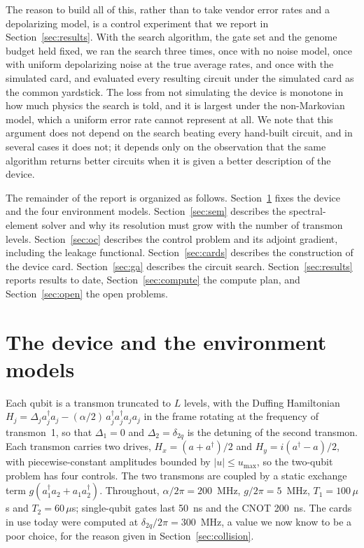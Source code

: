 \documentclass[10pt]{article}
\begin{document}
The reason to build all of this, rather than to take vendor error rates and a
depolarizing model, is a control experiment that we report in
Section~\ref{sec:results}. With the search algorithm, the gate set and the
genome budget held fixed, we ran the search three times, once with no noise
model, once with uniform depolarizing noise at the true average rates, and once
with the simulated card, and evaluated every resulting circuit under the
simulated card as the common yardstick. The loss from not simulating the
device is monotone in how much physics the search is told, and it is largest
under the non-Markovian model, which a uniform error rate cannot represent at
all. We note that this argument does not depend on the search beating every
hand-built circuit, and in several cases it does not; it depends only on the
observation that the same algorithm returns better circuits when it is given a
better description of the device.

The remainder of the report is organized as follows.
Section~\ref{sec:models} fixes the device and the four environment models.
Section~\ref{sec:sem} describes the spectral-element solver and why its
resolution must grow with the number of transmon levels.
Section~\ref{sec:oc} describes the control problem and its adjoint gradient,
including the leakage functional. Section~\ref{sec:cards} describes the
construction of the device card. Section~\ref{sec:ga} describes the circuit
search. Section~\ref{sec:results} reports results to date,
Section~\ref{sec:compute} the compute plan, and Section~\ref{sec:open} the
open problems.

\section{The device and the environment models}
\label{sec:models}

Each qubit is a transmon truncated to $L$ levels, with the Duffing Hamiltonian
$H_j = \Delta_j a_j^\dagger a_j - (\alpha/2)\, a_j^\dagger a_j^\dagger a_j a_j$
in the frame rotating at the frequency of transmon~1, so that $\Delta_1 = 0$
and $\Delta_2 = \delta_{2q}$ is the detuning of the second transmon. Each
transmon carries two drives, $H_x = (a + a^\dagger)/2$ and
$H_y = i(a^\dagger - a)/2$, with piecewise-constant amplitudes bounded by
$|u| \le u_{\max}$, so the two-qubit problem has four controls. The two
transmons are coupled by a static exchange term
$g(a_1^\dagger a_2 + a_1 a_2^\dagger)$. Throughout, $\alpha/2\pi = 200$~MHz,
$g/2\pi = 5$~MHz, $T_1 = 100\,\mu$s and $T_2 = 60\,\mu$s; single-qubit gates
last 50~ns and the CNOT 200~ns. The cards in use today were computed at
$\delta_{2q}/2\pi = 300$~MHz, a value we now know to be a poor choice, for the
reason given in Section~\ref{sec:collision}.
\end{document}
